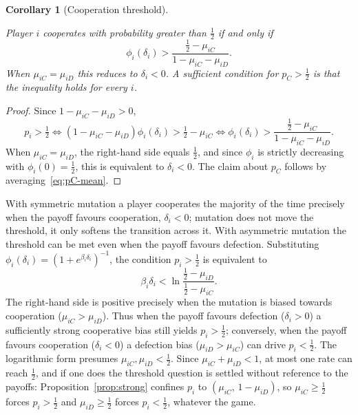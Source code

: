 \documentclass[11pt]{article}
\newtheorem{corollary}{Corollary}
\newcommand{\pC}{p_C}
\begin{document}
\begin{corollary}[Cooperation threshold]\label{cor:threshold}

Player \(i\) cooperates with probability greater than \(\tfrac{1}{2}\) if and only if
\[
  \phi_i(\delta_i) > \frac{\tfrac{1}{2}-\mu_{iC}}{1-\mu_{iC}-\mu_{iD}}.
\]
When \(\mu_{iC}=\mu_{iD}\) this reduces to \(\delta_i<0\). A sufficient condition for
\(\pC>\tfrac{1}{2}\) is that the inequality holds for every \(i\).

\end{corollary}

\begin{proof}

Since \(1-\mu_{iC}-\mu_{iD}>0\),
\[
  p_i > \tfrac{1}{2}
  \iff (1-\mu_{iC}-\mu_{iD})\phi_i(\delta_i) > \tfrac{1}{2}-\mu_{iC}
  \iff \phi_i(\delta_i) > \frac{\tfrac{1}{2}-\mu_{iC}}{1-\mu_{iC}-\mu_{iD}}.
\]
When \(\mu_{iC}=\mu_{iD}\), the right-hand side equals \(\tfrac{1}{2}\), and since
\(\phi_i\) is strictly decreasing with \(\phi_i(0)=\tfrac{1}{2}\), this is equivalent
to \(\delta_i<0\). The claim about \(\pC\) follows by averaging~\eqref{eq:pC-mean}.

\end{proof}

With symmetric mutation a player cooperates the majority of the time precisely when the
payoff favours cooperation, \(\delta_i<0\); mutation does not move the threshold, it
only
softens the transition across it. With asymmetric mutation the threshold can be met even
when the payoff favours defection. Substituting
\(\phi_i(\delta_i)=(1+e^{\beta_i\delta_i})^{-1}\), the condition \(p_i>\tfrac{1}{2}\) is
equivalent to
\[
  \beta_i\delta_i < \ln\frac{\tfrac{1}{2}-\mu_{iD}}{\tfrac{1}{2}-\mu_{iC}}.
\]
The right-hand side is positive precisely when the mutation is biased towards
cooperation
(\(\mu_{iC}>\mu_{iD}\)). Thus when the payoff favours defection (\(\delta_i>0\)) a
sufficiently strong cooperative bias still yields \(p_i>\tfrac{1}{2}\); conversely, when
the payoff favours cooperation (\(\delta_i<0\)) a defection bias (\(\mu_{iD}>\mu_{iC}\))
can drive \(p_i<\tfrac{1}{2}\). The logarithmic form presumes
\(\mu_{iC},\mu_{iD}<\tfrac{1}{2}\). Since \(\mu_{iC}+\mu_{iD}<1\), at most
one rate can reach \(\tfrac{1}{2}\), and if one does the threshold question
is settled without reference to the payoffs:
Proposition~\ref{prop:strong} confines \(p_i\) to
\((\mu_{iC},\,1-\mu_{iD})\), so \(\mu_{iC}\ge\tfrac{1}{2}\) forces
\(p_i>\tfrac{1}{2}\) and \(\mu_{iD}\ge\tfrac{1}{2}\) forces
\(p_i<\tfrac{1}{2}\), whatever the game.
\end{document}
